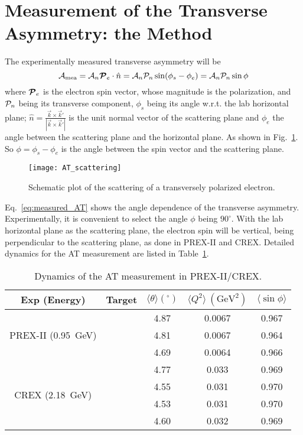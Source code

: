 \section{Measurement of the Transverse Asymmetry: the Method}
The experimentally measured transverse asymmetry will be
\begin{equation}
    \mathcal{A}_{\text{mea}} = \mathcal{A}_n \boldsymbol{\mathcal{P}}_e \cdot \hat{n} = \mathcal{A}_n \mathcal{P}_n \sin(\phi_s - \phi_e) = \mathcal{A}_n \mathcal{P}_n \sin\phi
    \label{eq:measured_AT}
\end{equation}
where $\boldsymbol{\mathcal{P}}_e$ is the electron spin vector, whose magnitude is the polarization,
and $\mathcal{P}_n$ being its transverse component,
$\phi_s$ being its angle w.r.t. the lab horizontal plane; 
$\hat{n} = \frac{\vec{k} \times \vec{k}'}{|\vec{k} \times \vec{k}'|}$ 
is the unit normal vector of the scattering plane and $\phi_e$ the angle between
the scattering plane and the horizontal plane. As shown in Fig.~\ref{fig:AT_scattering}.
So $\phi = \phi_s - \phi_e$ is the angle between the spin vector and the scattering plane.
\begin{figure}[h!]
    \centering
    \texttt{[image: AT\_scattering]}
    \caption{Schematic plot of the scattering of a transversely polarized electron.}
    \label{fig:AT_scattering}
\end{figure}

Eq.~\ref{eq:measured_AT} shows the angle dependence of the transverse asymmetry. 
Experimentally, it is convenient to select the angle $\phi$ being $90^\circ$. 
With the lab horizontal plane as the scattering plane, the electron spin will
be vertical, being perpendicular to the scattering plane, as done in PREX-II and CREX. 
Detailed dynamics for the AT measurement are listed in Table~\ref{tab:AT_dynamics}.

\begin{table}
    \centering
    \begin{tabular}{c c | c c c}
	\hline
	Exp (Energy)	& Target    & $\langle \theta \rangle ({}^\circ)$   & $\langle Q^2 \rangle \ (\mathrm{GeV}^2)$	& $\langle \sin\phi \rangle$	\\
	\hline
	\multirow{3}{*}{PREX-II (0.95~GeV)}
	    & \Carbon    & 4.87  & 0.0067    & 0.967 \\ 
	    & \ca   & 4.81  & 0.0067    & 0.964 \\ 
	    & \Pb   & 4.69  & 0.0064    & 0.966 \\ 
	\hline
	\multirow{4}{*}{CREX (2.18~GeV)}
	    & \Carbon    & 4.77  & 0.033	& 0.969 \\ 
	    & \ca   & 4.55  & 0.031	& 0.970 \\ 
	    & \Ca   & 4.53  & 0.031     & 0.970 \\ 
	    & \Pb   & 4.60  & 0.032     & 0.969 \\ 
	\hline
    \end{tabular}
    \caption{Dynamics of the AT measurement in PREX-II/CREX.}
    \label{tab:AT_dynamics}
\end{table}


